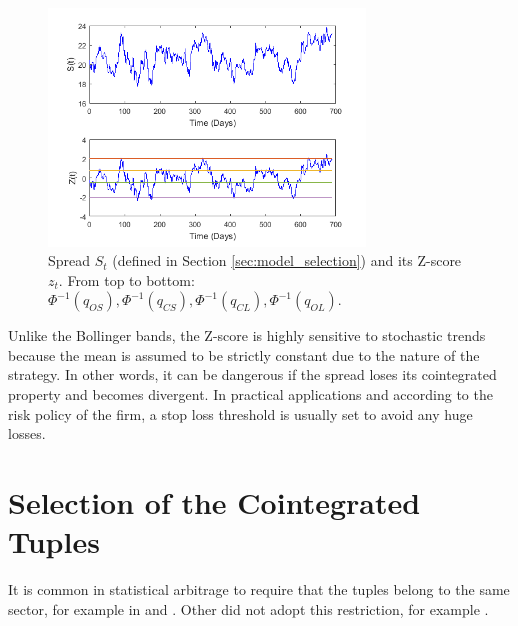 \documentclass[11pt,a4,twosided,singlespacing,titlepagenumber=on]{scrreprt}
\numberwithin{equation}{chapter} %
\theoremstyle{remark}
\begin{document}
\begin{figure}[H]
\centering
\includegraphics[width = 0.75\textwidth]{zscore/zscore1}
\caption{Spread $S_t$ (defined in Section \ref{sec:model_selection}) and its Z-score $z_t$. From top to bottom: $\Phi^{-1}(q_{OS}), \Phi^{-1}(q_{CS}), \Phi^{-1}(q_{CL}), \Phi^{-1}(q_{OL})$.}
\label{zscore_graphical_strat}
\end{figure}

Unlike the Bollinger bands, the Z-score is highly sensitive to stochastic trends because the mean is assumed to be strictly constant due to the nature of the strategy. In other words, it can be dangerous if the spread loses its cointegrated property and becomes divergent. In practical applications and according to the risk policy of the firm, a stop loss threshold is usually set to avoid any huge losses.

\section{Selection of the Cointegrated Tuples}
It is common in statistical arbitrage to require that the tuples belong to the same sector, for example in \cite{chan2009} and \cite{dunis2010}. Other did not adopt this restriction, for example \cite{caldeira2013}. 
\end{document}
